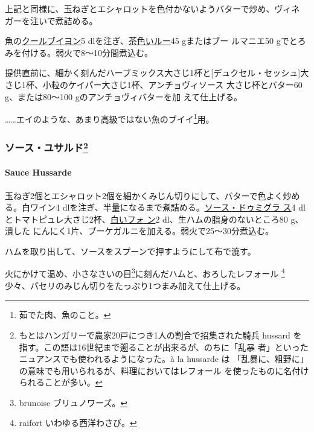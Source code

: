 上記と同様に、玉ねぎとエシャロットを色付かないようバターで炒め、ヴィネ
ガーを注いで煮詰める。

魚の\href{}{クールブイヨン}5
dlを注ぎ、\protect\hyperlink{roux-brun}{茶色いルー}45 gまたはブー
ルマニエ50 gでとろみを付ける。弱火で8〜10分間煮込む。

提供直前に、細かく刻んだハーブミックス大さじ1杯と{[}デュクセル・セッシュ{]}大
さじ1\undemi{}杯、小粒のケイパー大さじ1\undemi{}杯、アンチョヴィソース
大さじ\undemi{}杯とバター60 g、または80〜100 gのアンチョヴィバターを加
えて仕上げる。

\ldots{}\ldots{}エイのような、あまり高級ではない魚のブイイ\footnote{茹でた肉、魚のこと。}用。

\maeaki

\hypertarget{ux30bdux30fcux30b9ux30e6ux30b5ux30ebux30c951}{%
\subsubsection[ソース・ユサルド]{\texorpdfstring{ソース・ユサルド\footnote{もとはハンガリーで農家20戸につき1人の割合で招集された騎兵
  hussard を指す。この語は16世紀まで遡ることが出来るが、のちに「乱暴
  者」といったニュアンスでも使われるようになった。à la hussarde は
  「乱暴に、粗野に」の意味でも用いられるが、料理においてはレフォール
  を使ったものに名付けられることが多い。}}{ソース・ユサルド}}\label{ux30bdux30fcux30b9ux30e6ux30b5ux30ebux30c951}}

\hypertarget{sauce-hussarde}{%
\paragraph{Sauce Hussarde}\label{sauce-hussarde}}

  

玉ねぎ2個とエシャロット2個を細かくみじん切りにして、バターで色よく炒め
る。白ワイン4
dlを注ぎ、半量になるまで煮詰める。\protect\hyperlink{sauce-demi-glace}{ソース・ドゥミグラ
ス}4
dlとトマトピュレ大さじ2杯、\protect\hyperlink{fonds-blanc-ordinaire}{白いフォ
ン}2 dl、生ハムの脂身のないところ80 g、潰した
にんにく1片、ブーケガルニを加える。弱火で25〜30分煮込む。

ハムを取り出して、ソースをスプーンで押すようにして布で漉す。

火にかけて温め、小さなさいの目\footnote{brunoise ブリュノワーズ。}に刻んだハムと、おろしたレフォール
\footnote{raifort いわゆる西洋わさび。}少々、パセリのみじん切りをたっぷり1つまみ加えて仕上げる。

